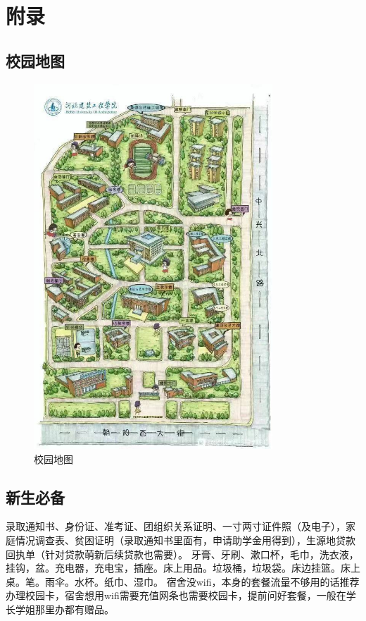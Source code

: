 \documentclass[12pt]{article} %
\begin{document}

		\newpage
\section{附录} 
	\subsection*{校园地图}
	\begin{figure}[!h]
	\centering
	\includegraphics[width=0.8\textwidth]{map.jpg}
	\caption{校园地图} %
\end{figure}
	\subsection*{新生必备}
	 录取通知书、身份证、准考证、团组织关系证明、一寸两寸证件照（及电子），家庭情况调查表、贫困证明（录取通知书里面有，申请助学金用得到），生源地贷款回执单（针对贷款萌新后续贷款也需要）。
	\frameboxend
	牙膏、牙刷、漱口杯，毛巾，洗衣液，挂钩，盆。充电器，充电宝，插座。床上用品。垃圾桶，垃圾袋。床边挂篮。床上桌。笔。雨伞。水杯。纸巾、湿巾。
	\frameboxend
	宿舍没wifi，本身的套餐流量不够用的话推荐办理校园卡，宿舍想用wifi需要充值网条也需要校园卡，提前问好套餐，一般在学长学姐那里办都有赠品。
	\frameboxend
\end{document}
